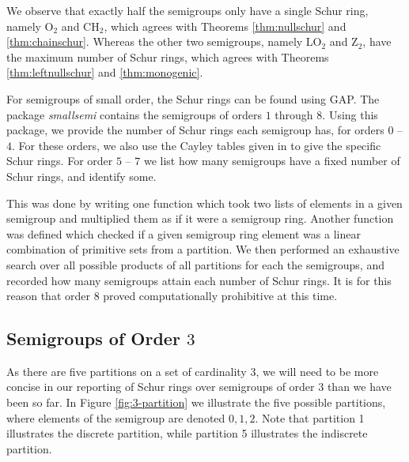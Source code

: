 \documentclass{article}
\theoremstyle{plain}
\theoremstyle{definition}
\newcommand{\LO}{\mathrm{LO}}
\newcommand{\CH}{\mathrm{CH}}
\newcommand{\z}{\mathrm{Z}}
\begin{document}
We observe that exactly half the semigroups only have a single Schur ring, namely $\text{O}_2$ and $\CH_2$, which agrees with Theorems \ref{thm:nullschur} and \ref{thm:chainschur}. Whereas the other two semigroups, namely $\LO_2$ and $\z_2$, have the maximum number of Schur rings, which agrees with Theorems \ref{thm:leftnullschur} and \ref{thm:monogenic}. 

For semigroups of small order, the Schur rings can be found using GAP. The package \textit{smallsemi} contains the semigroups of orders $1$ through $8$. Using this package, we provide the number of Schur rings each semigroup has, for orders $0$ -- $4$. For these orders, we also use the Cayley tables given in \cite{Forsythe} to give the specific Schur rings. For order $5$ -- $7$ we list how many semigroups have a fixed number of Schur rings, and identify some.  

This was done by writing one function which took two lists of elements in a given semigroup and multiplied them as if it were a semigroup ring. Another function was defined which checked if a given semigroup ring element was a linear combination of primitive sets from a partition. We then performed an exhaustive search over all possible products of all partitions for each the semigroups, and recorded how many semigroups attain each number of Schur rings. It is for this reason that order $8$ proved computationally prohibitive at this time.

\subsection{Semigroups of Order $3$}
As there are five partitions on a set of cardinality 3, we will need to be more concise in our reporting of Schur rings over semigroups of order $3$ than we have been so far. In Figure \ref{fig:3-partition} we illustrate the five possible partitions, where elements of the semigroup are denoted $0,1,2$. Note that partition 1 illustrates the discrete partition, while partition 5 illustrates the indiscrete partition. 
\end{document}
